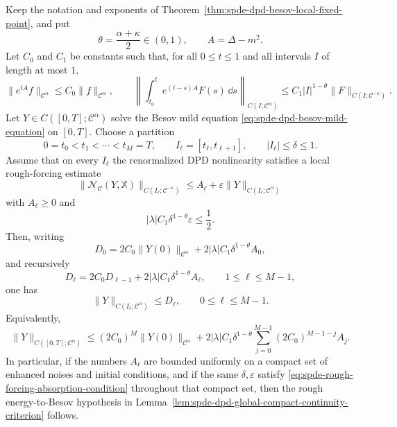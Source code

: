 \begin{proposition}
\label{prop:spde-dpd-rough-forcing-bootstrap}
Keep the notation and exponents of
Theorem~\ref{thm:spde-dpd-besov-local-fixed-point}, and put
\[
  \theta=\frac{\alpha+\kappa}{2}\in(0,1),
  \qquad A=\Delta-m^2 .
\]
Let \(C_0\) and \(C_1\) be constants such that, for all
\(0\leq t\leq1\) and all intervals \(I\) of length at most \(1\),
\begin{equation}
  \|e^{tA}f\|_{\mathcal C^\alpha}
  \leq C_0\|f\|_{\mathcal C^\alpha},
  \qquad
  \left\|\int_{t_0}^t e^{(t-s)A}F(s)\,\dd s
  \right\|_{C(I;\mathcal C^\alpha)}
  \leq
  C_1 |I|^{1-\theta}\|F\|_{C(I;\mathcal C^{-\kappa})}.
  \label{eq:spde-rough-forcing-bootstrap-semigroup}
\end{equation}
Let \(Y\in C([0,T];\mathcal C^\alpha)\) solve the Besov mild equation
\eqref{eq:spde-dpd-besov-mild-equation} on \([0,T]\).  Choose a partition
\[
  0=t_0<t_1<\cdots<t_M=T,
  \qquad I_\ell=[t_\ell,t_{\ell+1}],
  \qquad |I_\ell|\leq\delta\leq1 .
\]
Assume that on every \(I_\ell\) the renormalized DPD nonlinearity satisfies
a local rough-forcing estimate
\begin{equation}
  \|\mathcal N_{\mathcal C}(Y,\mathbb X)\|_{C(I_\ell;\mathcal C^{-\kappa})}
  \leq A_\ell+\varepsilon
  \|Y\|_{C(I_\ell;\mathcal C^\alpha)}
  \label{eq:spde-local-rough-forcing-estimate}
\end{equation}
with \(A_\ell\geq0\) and
\begin{equation}
  |\lambda|C_1\delta^{1-\theta}\varepsilon\leq \frac12 .
  \label{eq:spde-rough-forcing-absorption-condition}
\end{equation}
Then, writing
\[
  D_0=
  2C_0\|Y(0)\|_{\mathcal C^\alpha}
  +2|\lambda|C_1\delta^{1-\theta}A_0,
\]
and recursively
\[
  D_\ell=
  2C_0D_{\ell-1}
  +2|\lambda|C_1\delta^{1-\theta}A_\ell,
  \qquad 1\leq \ell\leq M-1,
\]
one has
\begin{equation}
  \|Y\|_{C(I_\ell;\mathcal C^\alpha)}\leq D_\ell,
  \qquad 0\leq\ell\leq M-1.
  \label{eq:spde-rough-forcing-bootstrap-recursive-bound}
\end{equation}
Equivalently,
\begin{equation}
  \|Y\|_{C([0,T];\mathcal C^\alpha)}
  \leq
  (2C_0)^M\|Y(0)\|_{\mathcal C^\alpha}
  +
  2|\lambda|C_1\delta^{1-\theta}
  \sum_{j=0}^{M-1}(2C_0)^{M-1-j}A_j .
  \label{eq:spde-rough-forcing-bootstrap-explicit-bound}
\end{equation}
In particular, if the numbers \(A_\ell\) are bounded uniformly on a compact
set of enhanced noises and initial conditions, and if the same
\(\delta,\varepsilon\) satisfy
\eqref{eq:spde-rough-forcing-absorption-condition} throughout that compact
set, then the rough energy-to-Besov hypothesis in
Lemma~\ref{lem:spde-dpd-global-compact-continuity-criterion} follows.
\end{proposition}

